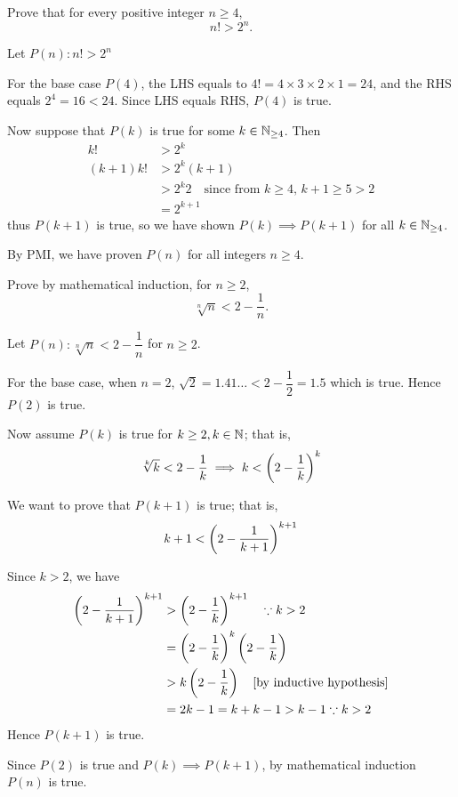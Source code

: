 \begin{exercise}
Prove that for every positive integer $n\ge4$,
\[ n!>2^n. \]
\end{exercise}

\begin{solution}
Let $P(n):n!>2^n$

For the base case $P(4)$, the LHS equals to $4!=4\times3\times2\times1=24$, and the RHS equals $2^4=16<24$. Since LHS equals RHS, $P(4)$ is true.

Now suppose that $P(k)$ is true for some $k\in\mathbb N_{\ge4}$. Then
\begin{align*}
k!&>2^k \\
(k+1)k!&>2^k(k+1)\\
&>2^k2\quad\text{since from $k\ge4$, $k+1\ge5>2$} \\
&=2^{k+1}
\end{align*}
thus $P(k+1)$ is true, so we have shown $P(k)\implies P(k+1)$ for all $k\in\mathbb N_{\ge4}$.

By PMI, we have proven $P(n)$ for all integers $n\ge4$.
\end{solution}

\begin{exercise}
Prove by mathematical induction, for $n\ge2$,
\[ \sqrt[n]{n}<2-\frac{1}{n}. \]
\end{exercise}

\begin{solution}
Let $P(n):\sqrt[n]{n}<2 - \dfrac{1}{n}$ for $n \ge 2$.

For the base case, when $n=2$, $\sqrt{2}=1.41\dots<2-\dfrac{1}{2}=1.5$ which is true. Hence $P(2)$ is true.

Now assume $P(k)$ is true for $k \ge 2, k \in \mathbb N$; that is,
\[ \sqrt[k]{k}<2 - \dfrac{1}{k} \implies k<\left(2-\frac{1}{k}\right)^k \]

We want to prove that $P(k+1)$ is true; that is,
\[ k+1<\left(2-\frac{1}{k+1}\right)^{k+1} \]

Since $k>2$, we have 
\begin{align*}
\left(2-\frac{1}{k+1}\right)^{k+1}
&> \left(2-\frac{1}{k}\right)^{k+1} \quad \because k>2 \\
&= \left(2-\frac{1}{k}\right)^k\left(2-\frac{1}{k}\right) \\
&> k\left(2-\frac{1}{k}\right) \quad \text{[by inductive hypothesis]} \\
&= 2k-1=k+k-1 > k-1 \because k>2
\end{align*}
Hence $P(k+1)$ is true.

Since $P(2)$ is true and $P(k)\implies P(k+1)$, by mathematical induction $P(n)$ is true.
\end{solution}

